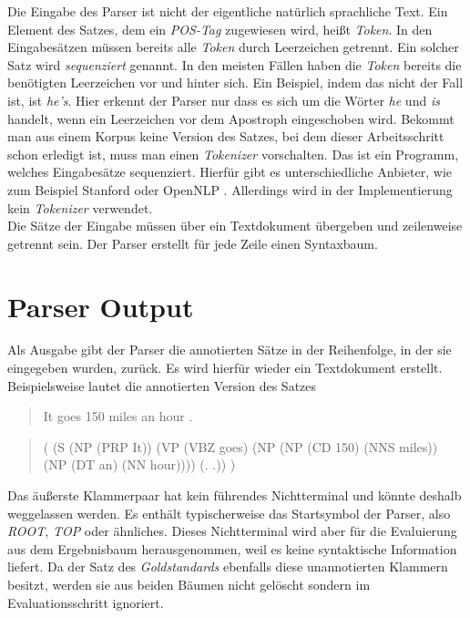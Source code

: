 Die Eingabe des Parser ist nicht der eigentliche natürlich sprachliche Text. Ein Element des Satzes, dem ein \textit{POS-Tag} zugewiesen wird, heißt \textit{Token}. In den Eingabesätzen müssen bereits alle \textit{Token} durch Leerzeichen getrennt. Ein solcher Satz wird \textit{sequenziert} genannt. In den meisten Fällen haben die \textit{Token} bereits die benötigten Leerzeichen vor und hinter sich. Ein Beispiel, indem das nicht der Fall ist, ist \textit{he's}. Hier erkennt der Parser nur dass es sich um die Wörter \textit{he} und \textit{is} handelt, wenn ein Leerzeichen vor dem Apostroph eingeschoben wird. Bekommt man aus einem Korpus keine Version des Satzes, bei dem dieser Arbeitsschritt schon erledigt ist, muss man einen \textit{Tokenizer} vorschalten. Das ist ein Programm, welches Eingabesätze sequenziert. Hierfür gibt es unterschiedliche Anbieter, wie zum Beispiel Stanford \cite{stanfordTokenizer} oder OpenNLP \cite{openNlpManual}. %
Allerdings wird in der Implementierung kein \textit{Tokenizer} verwendet. \\
Die Sätze der Eingabe müssen über ein Textdokument übergeben und zeilenweise getrennt sein. Der Parser erstellt für jede Zeile einen Syntaxbaum.

\section{Parser Output}
Als Ausgabe gibt der Parser die annotierten Sätze in der Reihenfolge, in der sie eingegeben wurden, zurück. Es wird hierfür wieder ein Textdokument erstellt. %
Beispielsweise lautet die annotierten Version des Satzes
\begin{quote}
It goes 150 miles an hour .
\end{quote}
\begin{quote}
( (S (NP (PRP It)) (VP (VBZ goes) (NP (NP (CD 150) (NNS miles)) \\(NP (DT an) (NN hour)))) (. .)) )
\end{quote}
Das äußerste Klammerpaar hat kein führendes Nichtterminal und könnte deshalb weggelassen werden. Es enthält typischerweise das Startsymbol der Parser, also \textit{ROOT}, \textit{TOP} oder ähnliches. Dieses Nichtterminal wird aber für die Evaluierung aus dem Ergebnisbaum herausgenommen, weil es keine syntaktische Information liefert. Da der Satz des \textit{Goldstandards} ebenfalls diese unannotierten Klammern besitzt, werden sie aus beiden Bäumen nicht gelöscht sondern im Evaluationsschritt ignoriert.
